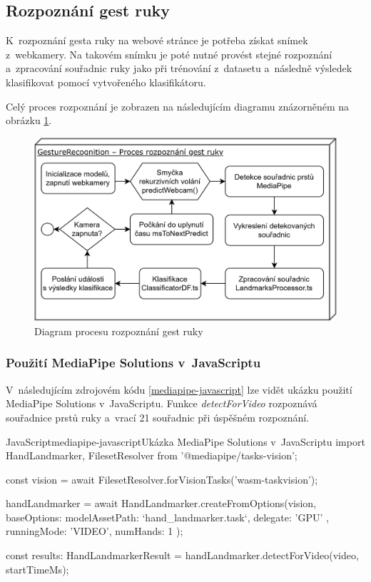 \documentclass[
  master,
  program=ainfvs,
  biblatex,
  figures=true,
  tables=false,
  sourcecodes=true,
  glossaries,
  index
]{kidiplom}
\begin{document}
    
    \subsection{Rozpoznání gest ruky}
        K~rozpoznání gesta ruky na webové stránce je potřeba získat snímek z~webkamery. Na takovém snímku je poté nutné provést stejné rozpoznání a~zpracování souřadnic ruky jako při trénování z~datasetu a~následně výsledek klasifikovat pomocí vytvořeného klasifikátoru. 
        
        Celý proces rozpoznání je zobrazen na následujícím diagramu znázorněném na obrázku \ref{gesture-recognition-diagram}.

        \begin{figure}[htbp]
            \centering
            \includegraphics[width=0.82\columnwidth]{graphics/gesture-recognition-diagram.png}
            \caption{Diagram procesu rozpoznání gest ruky}
            \label{gesture-recognition-diagram}
        \end{figure}
        
    
        \subsubsection{Použití MediaPipe Solutions v~JavaScriptu}

            V~následujícím zdrojovém kódu \ref{mediapipe-javascript} lze vidět ukázku použití MediaPipe Solutions v~JavaScriptu. Funkce \emph{detectForVideo} rozpoznává souřadnice prstů ruky a~vrací 21 souřadnic při úspěšném rozpoznání.

        \begin{kicode}{JavaScript}{mediapipe-javascript}{Ukázka MediaPipe Solutions v~JavaScriptu}
import {HandLandmarker, FilesetResolver} from '@mediapipe/tasks-vision';

const vision = await FilesetResolver.forVisionTasks('wasm-taskvision');

handLandmarker = await HandLandmarker.createFromOptions(vision, {
    baseOptions: {
        modelAssetPath: `hand_landmarker.task`,
        delegate: 'GPU'
    },
    runningMode: 'VIDEO',
    numHands: 1
});

const results: HandLandmarkerResult = handLandmarker.detectForVideo(video, startTimeMs);
        \end{kicode}
        
\end{document}
